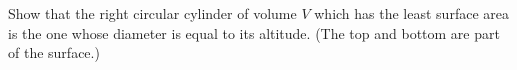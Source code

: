 Show that the right circular cylinder of volume $V$ which has the least surface
area is the one whose diameter is equal to its altitude. (The top and bottom
are part of the surface.)
